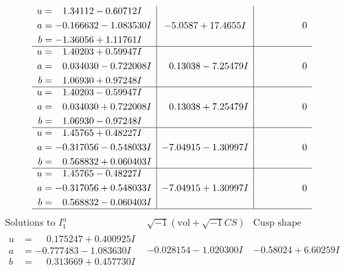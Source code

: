 \documentclass[1p]{elsarticle_modified}
\theoremstyle{definition}
\newcommand{\I}{\sqrt{-1}}
\begin{document}
$$\begin{array}{c|c|c}
\begin{aligned}
u &= \phantom{-}1.34112 - 0.60712 I \\
a &= -0.166632 - 1.083530 I \\
b &= -1.36056 + 1.11761 I\end{aligned}
 & -5.0587 + 17.4655 I & \phantom{-0.000000 } 0 \\ \hline\begin{aligned}
u &= \phantom{-}1.40203 + 0.59947 I \\
a &= \phantom{-}0.034030 - 0.722008 I \\
b &= \phantom{-}1.06930 + 0.97248 I\end{aligned}
 & \phantom{-}0.13038 - 7.25479 I & \phantom{-0.000000 } 0 \\ \hline\begin{aligned}
u &= \phantom{-}1.40203 - 0.59947 I \\
a &= \phantom{-}0.034030 + 0.722008 I \\
b &= \phantom{-}1.06930 - 0.97248 I\end{aligned}
 & \phantom{-}0.13038 + 7.25479 I & \phantom{-0.000000 } 0 \\ \hline\begin{aligned}
u &= \phantom{-}1.45765 + 0.48227 I \\
a &= -0.317056 - 0.548033 I \\
b &= \phantom{-}0.568832 + 0.060403 I\end{aligned}
 & -7.04915 - 1.30997 I & \phantom{-0.000000 } 0 \\ \hline\begin{aligned}
u &= \phantom{-}1.45765 - 0.48227 I \\
a &= -0.317056 + 0.548033 I \\
b &= \phantom{-}0.568832 - 0.060403 I\end{aligned}
 & -7.04915 + 1.30997 I & \phantom{-0.000000 } 0\\
 \hline 
 \end{array}$$\newpage$$\begin{array}{c|c|c}  
\text{Solutions to }I^u_{1}& \I (\text{vol} + \sqrt{-1}CS) & \text{Cusp shape}\\
 \hline 
\begin{aligned}
u &= \phantom{-}0.175247 + 0.400925 I \\
a &= -0.777483 - 1.083630 I \\
b &= \phantom{-}0.313669 + 0.457730 I\end{aligned}
 & -0.028154 - 1.020300 I & -0.58024 + 6.60259 I \\ \hline\begin{aligned}

\end{aligned}
\end{array}$$
\end{document}
